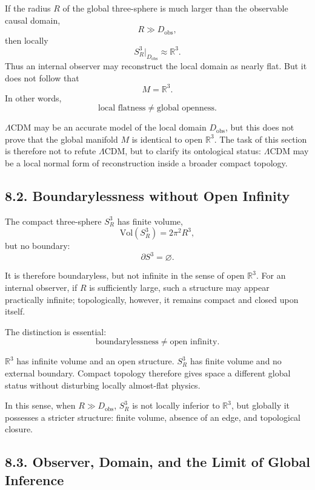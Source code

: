 \documentclass[12pt,a4paper]{article}
\theoremstyle{definition}
\begin{document}
If the radius \(R\) of the global three-sphere is much larger than the observable causal domain,
\[
R\gg D_{\mathrm{obs}},
\]
then locally
\[
S^3_R\big|_{D_{\mathrm{obs}}}\approx \mathbb R^3.
\]
Thus an internal observer may reconstruct the local domain as nearly flat. But it does not follow that
\[
M=\mathbb R^3.
\]
In other words,
\[
\text{local flatness}\neq \text{global openness}.
\]

\(\Lambda\)CDM may be an accurate model of the local domain \(D_{\mathrm{obs}}\), but this does not prove that the global manifold \(M\) is identical to open \(\mathbb R^3\). The task of this section is therefore not to refute \(\Lambda\)CDM, but to clarify its ontological status: \(\Lambda\)CDM may be a local normal form of reconstruction inside a broader compact topology.

\subsection*{8.2. Boundarylessness without Open Infinity}

The compact three-sphere \(S^3_R\) has finite volume,
\[
\mathrm{Vol}(S^3_R)=2\pi^2R^3,
\]
but no boundary:
\[
\partial S^3=\varnothing.
\]

It is therefore boundaryless, but not infinite in the sense of open \(\mathbb R^3\). For an internal observer, if \(R\) is sufficiently large, such a structure may appear practically infinite; topologically, however, it remains compact and closed upon itself.

The distinction is essential:
\[
\text{boundarylessness}\neq \text{open infinity}.
\]

\(\mathbb R^3\) has infinite volume and an open structure. \(S^3_R\) has finite volume and no external boundary. Compact topology therefore gives space a different global status without disturbing locally almost-flat physics.

In this sense, when \(R\gg D_{\mathrm{obs}}\), \(S^3_R\) is not locally inferior to \(\mathbb R^3\), but globally it possesses a stricter structure: finite volume, absence of an edge, and topological closure.

\subsection*{8.3. Observer, Domain, and the Limit of Global Inference}
\end{document}
